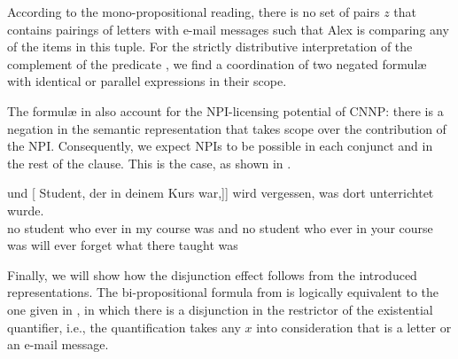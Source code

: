 \documentclass[output=paper]{langsci/langscibook}
\begin{document}
According to the mono-propositional reading, there is no set of pairs $z$ that contains pairings of letters with e-mail messages such that Alex is comparing any of the items in this tuple. 
%
For the strictly distributive interpretation of the complement of the predicate , we find a coordination of two negated formul\ae{} with identical or parallel expressions in their scope.




The formul\ae{} in  also account for the NPI-licensing potential of CNNP: 
there is a negation in the semantic representation that takes scope over the contribution of the NPI.
Consequently, we expect NPIs to be possible in each conjunct and in the rest of the clause. This is the case, as shown in . 

\ea \label{jemals3}
\gll [[\NE{Kein} Student, der \npi{jemals} in meinem Kurs war,] und [ Student, der  in deinem Kurs war,]] wird  vergessen, was dort unterrichtet wurde.\\
\hphantom{[[}no student who ever in my course was and \hphantom{[}no student who ever in your course was will ever forget what there taught was\\
\glt {}
\z 




Finally, we will show how the disjunction effect follows from the introduced representations. 
The bi-propositional formula from  is logically equivalent to the one given in , in which there is a disjunction in the restrictor of the existential quantifier, i.e., the quantification takes any $x$ into consideration that is a letter or an e-mail message.
\end{document}
